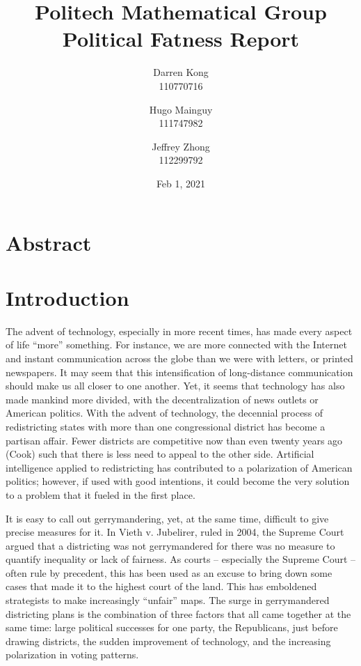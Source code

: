 \documentclass[letterpaper]{article}
\title{
	\textbf{Politech Mathematical Group} \\ 
	\vspace{2ex} 
	Political Fatness Report
	\vspace{2ex}
}
\author{
	Darren Kong \\ 110770716
	\and 
	Hugo Mainguy \\ 111747982
	\and 
	Jeffrey Zhong \\ 112299792
	\vspace{3ex}
}
\date{Feb 1, 2021}
\begin{document}
\begin{titlepage}
\maketitle
\thispagestyle{empty}
\end{titlepage}

\section{Abstract}
\section{Introduction}

The advent of technology, especially in more recent times, has made every aspect of life “more” something. For instance, we are more connected with the Internet and instant communication across the globe than we were with letters, or printed newspapers. It may seem that this intensification of long-distance communication should make us all closer to one another. Yet, it seems that technology has also made mankind more divided, with the decentralization of news outlets or American politics. With the advent of technology, the decennial process of redistricting states with more than one congressional district has become a partisan affair. Fewer districts are competitive now than even twenty years ago (Cook) such that there is less need to appeal to the other side. Artificial intelligence applied to redistricting has contributed to a polarization of American politics; however, if used with good intentions, it could become the very solution to a problem that it fueled in the first place.

It is easy to call out gerrymandering, yet, at the same time, difficult to give precise measures for it. In Vieth v. Jubelirer, ruled in 2004, the Supreme Court argued that a districting was not gerrymandered for there was no measure to quantify inequality or lack of fairness. As courts – especially the Supreme Court – often rule by precedent, this has been used as an excuse to bring down some cases that made it to the highest court of the land. This has emboldened strategists to make increasingly “unfair” maps. The surge in gerrymandered districting plans is the combination of three factors that all came together at the same time: large political successes for one party, the Republicans, just before drawing districts, the sudden improvement of technology, and the increasing polarization in voting patterns. 
\end{document}
